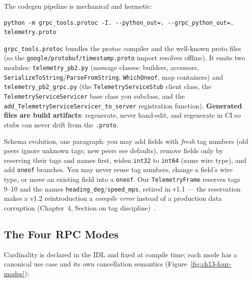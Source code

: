The codegen pipeline is mechanical and hermetic:

\begin{verbatim}
python -m grpc_tools.protoc -I. --python_out=. --grpc_python_out=. telemetry.proto
\end{verbatim}

\texttt{grpc\_tools.protoc} bundles the protoc compiler and the well-known
proto files (so the \texttt{google/protobuf/timestamp.proto} import resolves
offline). It emits two modules: \texttt{telemetry\_pb2.py} (message classes:
builders, accessors, \texttt{SerializeToString}/\texttt{ParseFromString},
\texttt{WhichOneof}, map containers) and \texttt{telemetry\_pb2\_grpc.py}
(the \texttt{TelemetryServiceStub} client class, the
\texttt{TelemetryServiceServicer} base class you subclass, and the
\texttt{add\_TelemetryServiceServicer\_to\_server} registration function).
\textbf{Generated files are build artifacts}: regenerate, never hand-edit, and
regenerate in CI so stubs can never drift from the \texttt{.proto}.

\begin{examplebox}
Schema evolution, one paragraph: you may add fields with \emph{fresh} tag
numbers (old peers ignore unknown tags; new peers see defaults), remove fields
only by reserving their tags and names first, widen \texttt{int32} to
\texttt{int64} (same wire type), and add \texttt{oneof} branches. You may never
reuse tag numbers, change a field's wire type, or move an existing field into a
\texttt{oneof}. Our \texttt{TelemetryFrame} reserves tags 9--10 and the names
\texttt{heading\_deg}/\texttt{speed\_mps}, retired in v1.1 --- the reservation
makes a v1.2 reintroduction a \emph{compile error} instead of a production data
corruption (Chapter~4, Section on tag discipline)~\cite{protobufdocs}.
\end{examplebox}

\subsection{The Four RPC Modes}
\label{subsec:ch13-modes}

Cardinality is declared in the IDL and fixed at compile time; each mode has a
canonical use case and its own cancellation semantics
(Figure~\ref{fig:ch13-four-modes}):

